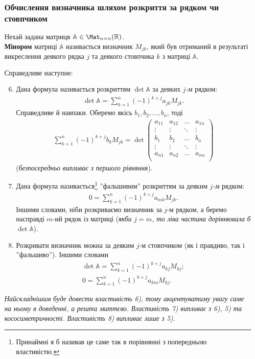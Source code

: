 \documentclass{math_library}
\begin{document}
\subsubsection*{Обчислення визначника шляхом розкриття за рядком чи стовпчиком}
\begin{definition}
Нехай задана матриця $\mathbb{A} \in \Mat_{n \times n}(\mathbb{R})$.\\
\textbf{Мінором} матриці $\mathbb{A}$ називається визначник $M_{jk}$, який був отриманий в результаті викреслення деякого рядка $j$ та деякого стовпчика $k$ з матриці $\mathbb{A}$.
\end{definition}

\begin{proposition}
Справедливе наступне:
\begin{enumerate}[nosep,wide=0pt,label={\arabic*)}]
\setcounter{enumi}{5}
\item Дана формула називається розкриттям $\det \mathbb{A}$ за деяких $j$\textit{-м} рядком:
\begin{align*}
\det \mathbb{A} = \displaystyle \sum_{k=1}^n (-1)^{k+j} a_{jk}M_{jk}.
\end{align*}
Справедливе й навпаки. Оберемо якісь $b_1,b_2,\dots,b_n$, тоді
\begin{align*}
\sum_{k=1}^n (-1)^{k+j} b_k M_{jk} = \det \begin{pmatrix}
a_{11} & a_{12} & \dots & a_{1n} \\
\vdots & \vdots & \ddots & \vdots \\
b_1 & b_2 & \dots & b_n \\
\vdots & \vdots & \ddots & \vdots \\
a_{n1} & a_{n2} & \dots & a_{nn} \\
\end{pmatrix}
\end{align*}
(\textit{безпосередньо випливає з першого рівняння}).

\item Дана формула називається\footnote{Принаймні я б називав це саме так в порівнянні з попередньою властивістю.} ''фальшивим'' розкриттям за деяким $j$\textit{-м} рядком:
\begin{align*}
0 = \sum_{k=1}^n (-1)^{k+j}a_{mk} M_{jk}.
\end{align*}
Іншими словами, ніби розкриваємо визначник за $j$-м рядком, а беремо насправді $m$-ий рядок із матриці (\textit{якби $j = m$, то ліва частина дорівнювала б $\det \mathbb{A}$}).

\item Розкривати визначник можна за деяким $j$-м стовпчиком (як і правдиво, так і ''фальшиво''). Іншими словами
\begin{align*}
\det \mathbb{A} = \sum_{k=1}^n (-1)^{k+j} a_{kj} M_{kj}; \\
0 = \sum_{k=1}^n (-1)^{k+j} a_{km} M_{kj}.
\end{align*}
\end{enumerate}
\end{proposition}
\noindent
\textit{Найскладнішим буде довести властивість 6), тому акцентуватиму увагу саме на ньому в доведенні, а решта миттєво. Властивість 7) випливає з 6), 5) та кососиметричності. Властивість 8) випливає лише з 5).}
\end{document}
